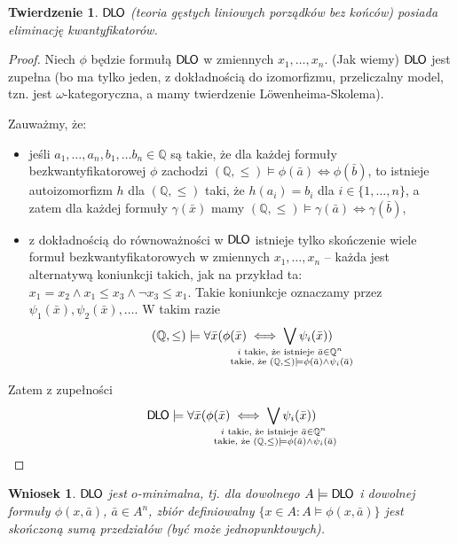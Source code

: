 \documentclass{article}
\newcommand{\Q}{\mathbb{Q}}
\theoremstyle{plain}
\newtheorem{tw}[thm]{Twierdzenie}
\newtheorem{wn}[thm]{Wniosek}
\theoremstyle{definition}
\theoremstyle{remark}
\newcommand{\DLO}{\mathsf{D \mkern-1.5mu L \mkern-1.8mu O}}
\begin{document}
\begin{tw}
	$\DLO$ (teoria gęstych liniowych porządków bez końców) posiada
	eliminację kwantyfikatorów.
\end{tw}
\begin{proof}
	Niech $\phi$ będzie formułą $\DLO$ w zmiennych $x_1, \ldots, x_n$.
	(Jak wiemy) $\DLO$ jest zupełna (bo ma tylko jeden, z dokładnością do
	izomorfizmu, przeliczalny model, tzn. jest $\omega$-kategoryczna, a
	mamy twierdzenie Löwenheima-Skolema).

	Zauważmy, że:
	\begin{itemize}
		\item jeśli $a_1, \ldots, a_n, b_1, \ldots b_n \in \Q$ są
			takie, że dla każdej formuły bezkwantyfikatorowej
			$\phi$ zachodzi $(\Q, \leq) \models \phi(\bar{a}) \iff
			\phi(\bar{b})$, to istnieje autoizomorfizm $h$ dla
			$(\Q, \leq)$ taki, że $h(a_i) = b_i$ dla $i \in \{1,
			\ldots, n\}$, a zatem dla każdej formuły
			$\gamma(\bar{x})$ mamy $(\Q, \leq) \models
			\gamma(\bar{a}) \iff \gamma(\bar{b})$,
		\item z dokładnością do równoważności w $\DLO$ istnieje tylko
			skończenie wiele formuł bezkwantyfikatorowych w
			zmiennych $x_1, \ldots, x_n$ -- każda jest alternatywą
			koniunkcji takich, jak na przykład ta: $x_1 = x_2
			\wedge x_1 \leq x_3 \wedge \neg x_3 \leq x_1$.
			Takie koniunkcje oznaczamy przez $\psi_1(\bar{x}),
			\psi_2(\bar{x}), \ldots$. W takim razie
			\[(\Q, \leq) \models \forall \bar{x} (\phi(\bar{x})
			\iff \bigvee_{\mathclap{\substack{i \text{ takie, że
			istnieje } \bar{a} \in \Q^n \\ \text{ takie, że }(\Q,
			\leq) \models \phi(\bar{a}) \wedge \psi_i(\bar{a})}}}
			\psi_i(\bar{x}))\]
	\end{itemize}
	Zatem z zupełności
	\[\DLO \models \forall \bar{x} (\phi(\bar{x}) \iff
	\bigvee_{\mathclap{\substack{i \text{ takie, że istnieje } \bar{a} \in
	\Q^n \\ \text{ takie, że }(\Q, \leq) \models \phi(\bar{a}) \wedge
	\psi_i(\bar{a})}}} \psi_i(\bar{x}))\]
\end{proof}

\begin{wn}
	$\DLO$ jest \em{$o$-minimalna}, tj. dla dowolnego $A \models \DLO$ i
	dowolnej formuły $\phi(x,\bar{a})$, $\bar{a} \in A^n$, zbiór
	definiowalny $\{x \in A \colon A \models \phi(x,\bar{a})\}$ jest
	skończoną sumą przedziałów (być może jednopunktowych).
\end{wn}
\end{document}
